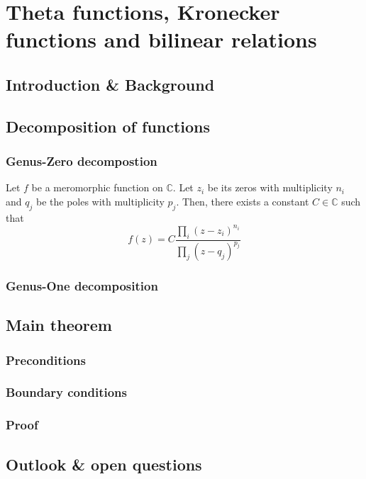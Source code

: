 


\chapter{Theta functions, Kronecker functions and bilinear relations}
\label{rep:B12}

\section{Introduction & Background}




\cite{ZCC22}
\cite{Bertola2010RiemannSA}

\section{Decomposition of functions}


\subsection{Genus-Zero decompostion}


\begin{theorem}
    Let $f$ be a meromorphic function on $\mathbb{C}$. Let $z_i$ be its zeros with multiplicity $n_i$ and $q_j$ be the poles with multiplicity $p_j$. Then, there exists a constant $C \in \mathbb{C}$ such that
    \begin{equation}
        f(z) = C\frac{\prod_i (z-z_i)^{n_i}}{\prod_j (z-q_j)^{p_j}} \label{eqnB12:gen0decomp}
    \end{equation}
\end{theorem}


\subsection{Genus-One decomposition}

\section{Main theorem}
\subsection{Preconditions}
\subsection{Boundary conditions}
\subsection{Proof}
\section{Outlook \& open questions}


